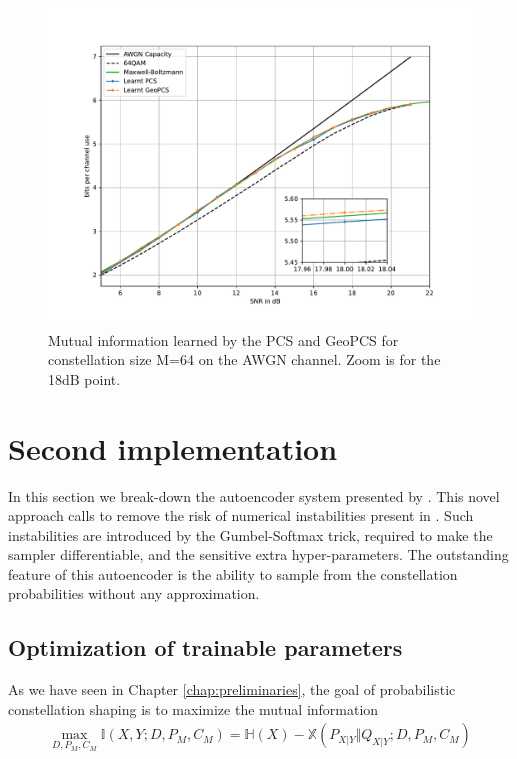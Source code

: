 \begin{figure}[h]
	\centering
	\includegraphics[width=\textwidth]{figs/stark_gcs.pdf}
    \caption{Mutual information learned by the PCS and GeoPCS for constellation size M=64 on the AWGN channel. Zoom is for the 18dB point.}
    \label{fig:starkPerf}
\end{figure}
\clearpage

\section{Second implementation}
In this section we break-down the autoencoder system presented by \citet{Aref}. This novel approach calls to remove the risk of numerical instabilities present in \cite{Stark}. Such instabilities are introduced by the Gumbel-Softmax trick, required to make the sampler differentiable, and the sensitive extra hyper-parameters. The outstanding feature of this autoencoder is the ability to sample from the constellation probabilities without any approximation.

\subsection{Optimization of trainable parameters}
\label{sec:parameters}
As we have seen in Chapter \ref{chap:preliminaries}, the goal of probabilistic constellation shaping is to maximize the mutual information
\begin{align}
	 \max_{D, P_M, C_M} \mathbb{I} \left(X , Y ; D, P_M, C_M \right) = \mathbb{H}(X) - \mathbb{X}(P_{X|Y} \Vert Q_{X|Y} ; D, P_M, C_M)
\end{align}

